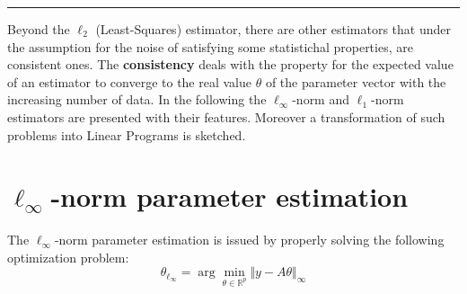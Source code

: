\hrule
\begin{center}
    \textsf{
        Beyond the $\ell_2$ (Least-Squares) estimator, there are other estimators that under the assumption for the noise of satisfying some statistichal properties, are consistent ones. The \textbf{consistency} deals with the property for the expected value of an estimator to converge to the real value $\theta$ of the parameter vector with the increasing number of data. In the following the $\ell_\infty$-norm and $\ell_1$-norm estimators are presented with their features. Moreover a transformation of such problems into Linear Programs is sketched.
    }
\end{center}
\section{$\ell_\infty$-norm parameter estimation}
The $\ell_\infty$-norm parameter estimation is issued by properly solving the following optimization problem: 
{\large{
    \color{red}
    \begin{equation}\label{eq:linfty}
        \theta_{\ell_\infty} = \arg\min_{\theta\in\mathbb{R}^p} {\Vert y-A\theta\Vert_\infty} 
    \end{equation}
}}

